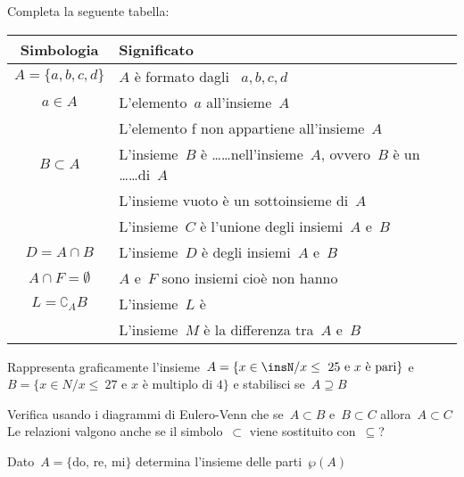 \begin{esercizio}
\label{ese:7.67}
Completa la seguente tabella:

\begin{tabular*}{.9\textwidth}{@{\extracolsep{\fill}}*{2}{cl}}
\toprule
Simbologia & Significato\\
\midrule
\(A=\{a,b,c,d\}\) & \(A\) è formato dagli \dotfill~\(a, b, c, d\)\\
\(a\in A\) & L'elemento~\(a\) \dotfill all'insieme~\(A\)\\
\dotfill & L'elemento f non appartiene all'insieme~\(A\)\\
\(B\subset A\) & L'insieme~\(B\) è \ldots\ldots nell'insieme~\(A\), ovvero~\(B\) è un 
\ldots\ldots di~\(A\)\\
\dotfill & L'insieme vuoto è un sottoinsieme di~\(A\)\\
\dotfill & L'insieme~\(C\) è l'unione degli insiemi~\(A\) e~\(B\)\\
\(D=A\cap B\) & L'insieme~\(D\) è \dotfill degli insiemi~\(A\) e~\(B\)\\
\(A\cap F=\emptyset \)& \(A\) e~\(F\) sono insiemi \dotfill cioè non hanno \dotfill \\
\(L=\complement_{A}B\) & L'insieme~\(L\) è \dotfill \\
\dotfill & L'insieme~\(M\) è la differenza tra~\(A\) e~\(B\)\\
\bottomrule
\end{tabular*}
\end{esercizio}

\begin{esercizio}
\label{ese:7.68}
Rappresenta graficamente l'insieme~\(A=\{x\in \insN/x\le~25 \text{ e } x\text{ è 
pari}\}\) e
\(B=\{x\in N/x\le~27\text{ e } x\text{ è multiplo di~4}\}\) e stabilisci 
se~\(A\supseteq B\)
\end{esercizio}

\begin{esercizio}
\label{ese:7.69}
Verifica usando i diagrammi di Eulero-Venn che se~\(A\subset B\) e~\(B\subset C\) 
allora~\(A\subset C\) Le relazioni valgono
anche se il simbolo~\({\subset}\) viene sostituito con~\({\subseteq}\)?
\end{esercizio}

\begin{esercizio}
\label{ese:7.70}
Dato~\(A=\{\text{do, re, mi}\}\) determina l'insieme delle parti~\(\wp (A)\)
\end{esercizio}

